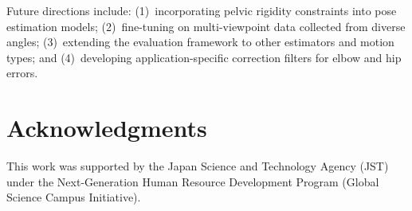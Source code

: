 \documentclass[twocolumn]{article}
\begin{document}
Future directions include: (1)~incorporating pelvic rigidity constraints
into pose estimation models; (2)~fine-tuning on multi-viewpoint data
collected from diverse angles; (3)~extending the evaluation framework to
other estimators and motion types; and (4)~developing application-specific
correction filters for elbow and hip errors.

\section*{Acknowledgments}

This work was supported by the Japan Science and Technology Agency (JST)
under the Next-Generation Human Resource Development Program (Global Science
Campus Initiative).
\end{document}
